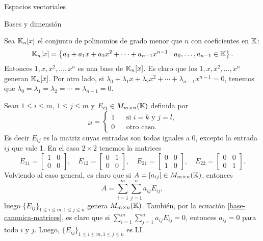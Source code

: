 \begin{chapter}{Espacios vectoriales}
\begin{section}{Bases y dimensi\'on}
\begin{ejemplo*}
    Sea $\mathbb K_n[x]$  el conjunto de polinomios de grado menor  que $n$ con coeficientes en $\mathbb K$:
    $$
    \mathbb K_n[x] = \left\{a_0 + a_1 x + a_2x^2+\cdots+a_{n-1}x^{n-1}: a_0,\ldots,a_{n-1} \in \mathbb K  \right\}.
    $$
    Entonces $1,x,x^2,\ldots,x^n$  es una base de $\mathbb K_n[x]$. Es claro que los $1,x,x^2,\ldots,x^n$ generan $\mathbb K_n[x]$. Por otro lado, si  $\lambda_0 + \lambda_1 x + \lambda_2x^2+\cdots+\lambda_{n-1}x^{n-1} =0$, tenemos que $\lambda_0=\lambda_1 = \lambda_2 =\cdots =\lambda_{n-1} =0$.
\end{ejemplo*}

\begin{ejemplo*} 
    Sean $1 \le i \le m$, $1\le j \le m$ y $E_{ij} \in M_{m \times n}(\mathbb K)$ definida por
    \begin{equation*}
        [E_{ij}]_{kl} = \left\{ 
        \begin{array}{lll}
        1& &\text{si $i=k$ y $j=l$,} \\
        0& &\text{otro caso}. 
        \end{array}
         \right.
    \end{equation*}
    Es decir $E_{ij}$  es la matriz cuyas entradas son todas iguales a 0,  excepto la entrada $ij$ que vale 1. En el caso $2 \times 2$  tenemos la matrices
    \begin{equation*}
        E_{11} = \begin{bmatrix} 1&0\\0&0\end{bmatrix}, \quad
        E_{12} = \begin{bmatrix} 0&1\\0&0\end{bmatrix}, \quad
        E_{21} = \begin{bmatrix} 0&0\\1&0\end{bmatrix}, \quad
        E_{22} = \begin{bmatrix} 0&0\\0&1\end{bmatrix}.
    \end{equation*}
    Volviendo al caso general,  es claro que si $A= [a_{ij}] \in M_{m \times n}(\mathbb K)$,  entonces
    \begin{equation}\label{base-canonica-matrices}
        A = \sum_{i=1}^{m} \sum_{j=1}^{n} a_{ij}E_{ij},
    \end{equation}
    luego $\{E_{ij} \}_{1 \le i \le m, 1\le j \le n}$ genera $M_{m \times n}(\mathbb K)$. También, por la ecuación \eqref{base-canonica-matrices}, es claro que si $\sum_{i=1}^{m} \sum_{j=1}^{n} a_{ij}E_{ij}=0$,  entonces $a_{ij}=0$ para todo $i$ y $j$. Luego,  $\{E_{ij} \}_{1 \le i \le m, 1\le j \le n}$ es LI. 
    

\end{ejemplo*}
\end{section}
\end{chapter}
